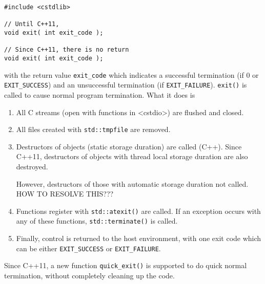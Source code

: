 \begin{verbatim}
#include <cstdlib>

// Until C++11, 
void exit( int exit_code );

// Since C++11, there is no return
void exit( int exit_code );
\end{verbatim}
with the return value \verb!exit_code! which indicates a successful termination
(if 0 or \verb!EXIT_SUCCESS!) and an unsuccessful termination (if
\verb!EXIT_FAILURE!). \verb!exit()! is called to cause normal program
termination. What it does is
\begin{enumerate}
  \item All C streams (open with functions in <cstdio>) are flushed and closed.
  \item All files created with \verb!std::tmpfile! are removed.
  \item Destructors of objects (static storage duration) are called (C++). Since
  C++11, destructors of objects with thread local storage duration are also destroyed. 
  
  However, destructors of those with automatic storage duration not called. HOW TO RESOLVE THIS???
  
  \item Functions register with \verb!std::atexit()! are called. If an exception
  occurs with any of these functions, \verb!std::terminate()! is called.
  \item Finally, control is returned to the host environment, with one exit code
  which can be either \verb!EXIT_SUCCESS! or \verb!EXIT_FAILURE!.
\end{enumerate}

Since C++11, a new function \verb!quick_exit()! is supported to do quick normal
termination, without completely cleaning up the code.
